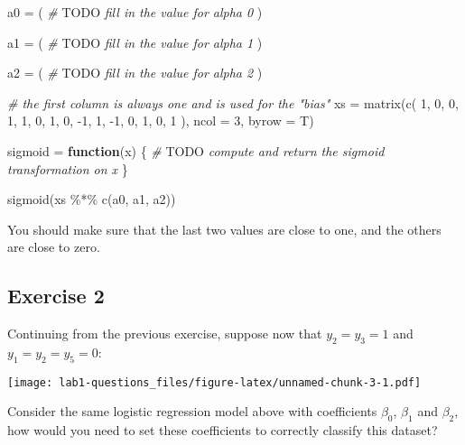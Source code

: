 \documentclass[
]{article}
\newenvironment{Shaded}{\begin{snugshade}}{\end{snugshade}}
\newcommand{\AlertTok}[1]{\textcolor[rgb]{0.94,0.16,0.16}{#1}}
\newcommand{\AttributeTok}[1]{\textcolor[rgb]{0.77,0.63,0.00}{#1}}
\newcommand{\CommentTok}[1]{\textcolor[rgb]{0.56,0.35,0.01}{\textit{#1}}}
\newcommand{\ControlFlowTok}[1]{\textcolor[rgb]{0.13,0.29,0.53}{\textbf{#1}}}
\newcommand{\DecValTok}[1]{\textcolor[rgb]{0.00,0.00,0.81}{#1}}
\newcommand{\FunctionTok}[1]{\textcolor[rgb]{0.00,0.00,0.00}{#1}}
\newcommand{\NormalTok}[1]{#1}
\newcommand{\OtherTok}[1]{\textcolor[rgb]{0.56,0.35,0.01}{#1}}
\newcommand{\SpecialCharTok}[1]{\textcolor[rgb]{0.00,0.00,0.00}{#1}}
\begin{document}
\begin{Shaded}
\begin{Highlighting}[]
\NormalTok{a0 }\OtherTok{=}\NormalTok{ (}
  \CommentTok{\# }\AlertTok{TODO}\CommentTok{ fill in the value for alpha 0}
\NormalTok{)}

\NormalTok{a1 }\OtherTok{=}\NormalTok{ (}
  \CommentTok{\# }\AlertTok{TODO}\CommentTok{ fill in the value for alpha 1}
\NormalTok{)}

\NormalTok{a2 }\OtherTok{=}\NormalTok{ (}
  \CommentTok{\# }\AlertTok{TODO}\CommentTok{ fill in the value for alpha 2}
\NormalTok{)}

\CommentTok{\# the first column is always one and is used for the "bias"}
\NormalTok{xs }\OtherTok{=} \FunctionTok{matrix}\NormalTok{(}\FunctionTok{c}\NormalTok{(}
  \DecValTok{1}\NormalTok{, }\DecValTok{0}\NormalTok{, }\DecValTok{0}\NormalTok{,}
  \DecValTok{1}\NormalTok{, }\DecValTok{1}\NormalTok{, }\DecValTok{0}\NormalTok{,}
  \DecValTok{1}\NormalTok{, }\DecValTok{0}\NormalTok{, }\SpecialCharTok{{-}}\DecValTok{1}\NormalTok{,}
  \DecValTok{1}\NormalTok{, }\SpecialCharTok{{-}}\DecValTok{1}\NormalTok{, }\DecValTok{0}\NormalTok{,}
  \DecValTok{1}\NormalTok{, }\DecValTok{0}\NormalTok{, }\DecValTok{1}
\NormalTok{), }\AttributeTok{ncol =} \DecValTok{3}\NormalTok{, }\AttributeTok{byrow =}\NormalTok{ T)}

\NormalTok{sigmoid }\OtherTok{=} \ControlFlowTok{function}\NormalTok{(x) \{}
  \CommentTok{\# }\AlertTok{TODO}\CommentTok{ compute and return the sigmoid transformation on x}
\NormalTok{\}}

\FunctionTok{sigmoid}\NormalTok{(xs }\SpecialCharTok{\%*\%} \FunctionTok{c}\NormalTok{(a0, a1, a2))}
\end{Highlighting}
\end{Shaded}

You should make sure that the last two values are close to one, and the
others are close to zero.

\hypertarget{exercise-2}{%
\subsection{Exercise 2}\label{exercise-2}}

Continuing from the previous exercise, suppose now that \(y_2=y_3=1\)
and \(y_1=y_2=y_5=0\):

\texttt{[image: lab1-questions\_files/figure-latex/unnamed-chunk-3-1.pdf]}

Consider the same logistic regression model above with coefficients
\(\beta_0\), \(\beta_1\) and \(\beta_2\), how would you need to set
these coefficients to correctly classify this dataset?
\end{document}
